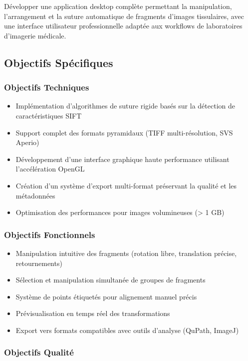 \documentclass[12pt,a4paper]{report}
\begin{document}
Développer une application desktop complète permettant la manipulation, l'arrangement et la suture automatique de fragments d'images tissulaires, avec une interface utilisateur professionnelle adaptée aux workflows de laboratoires d'imagerie médicale.

\subsection{Objectifs Spécifiques}

\subsubsection{Objectifs Techniques}

\begin{itemize}
\item Implémentation d'algorithmes de suture rigide basés sur la détection de caractéristiques SIFT
\item Support complet des formats pyramidaux (TIFF multi-résolution, SVS Aperio)
\item Développement d'une interface graphique haute performance utilisant l'accélération OpenGL
\item Création d'un système d'export multi-format préservant la qualité et les métadonnées
\item Optimisation des performances pour images volumineuses (> 1 GB)
\end{itemize}

\subsubsection{Objectifs Fonctionnels}

\begin{itemize}
\item Manipulation intuitive des fragments (rotation libre, translation précise, retournements)
\item Sélection et manipulation simultanée de groupes de fragments
\item Système de points étiquetés pour alignement manuel précis
\item Prévisualisation en temps réel des transformations
\item Export vers formats compatibles avec outils d'analyse (QuPath, ImageJ)
\end{itemize}

\subsubsection{Objectifs Qualité}
\end{document}
